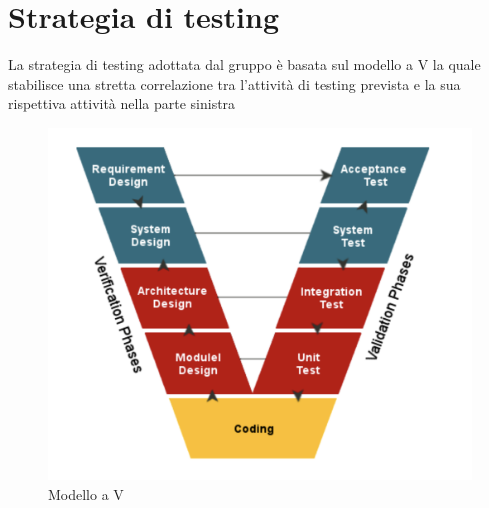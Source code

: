 
\newcommand{\stepCTS}[0]{\stepcounter{CTS}} %
\newcommand{\valueCTS}[0]{\stepCTS TS\arabic{CTS}\label{_TS\arabic{CTS}}} %
\newcommand{\refCTS}[0]{\stepCTS \hyperref[_TS\arabic{CTS}]{TS\arabic{CTS}}}
\newcommand{\resetCTS}[0]{\setcounter{CTS}{0}}
\resetCTS

\newcommand{\stepCTU}[0]{\stepcounter{CTU}} %
\newcommand{\valueCTU}[0]{\stepCTU TU\arabic{CTU}\label{_TU\arabic{CTU}}} %
\newcommand{\refCTU}[0]{\stepCTU \hyperref[_TS\arabic{CTU}]{TU\arabic{CTU}}}
\newcommand{\resetCTU}[0]{\setcounter{CTU}{0}}
\resetCTU

\newcommand{\stepCTI}[0]{\stepcounter{CTI}} %
\newcommand{\valueCTI}[0]{\stepCTI TI\arabic{CTI}\label{_TU\arabic{CTI}}} %
\newcommand{\refCTI}[0]{\stepCTI \hyperref[_TS\arabic{CTI}]{TI\arabic{CTI}}}
\newcommand{\resetCTI}[0]{\setcounter{CTI}{0}}
\resetCTI

\section{Strategia di testing} \label{_test}
La strategia di testing adottata dal gruppo è basata sul modello a V la quale stabilisce una stretta correlazione tra l'attività di testing prevista e la sua rispettiva attività nella parte sinistra \\
\begin{figure}[!htb]
	\centering
	\includegraphics[scale=0.50]{res/images/vtestmodel.png}
	\caption{Modello a V}
\end{figure}


